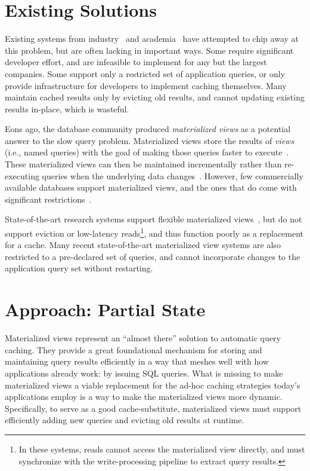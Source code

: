 \section{Existing Solutions}

Existing systems from industry~\cite{facebook-memcache, tao, flannel} and
academia~\cite{txcache, cachegenie, casql-consistency-thesis, pequod} have
attempted to chip away at this problem, but are often lacking in important ways.
Some require significant developer effort, and are infeasible to implement for
any but the largest companies. Some support only a restricted set of application
queries, or only provide infrastructure for developers to implement caching
themselves. Many maintain cached results only by evicting old results, and
cannot updating existing results in-place, which is wasteful.


Eons ago, the database community produced \textit{materialized views} as a
potential answer to the slow query problem. Materialized views store the results
of \textit{views} (i.e., named queries) with the goal of making those queries
faster to execute~\cite{materialized-views}. These materialized views can then
be maintained incrementally rather than re-executing queries when the underlying
data changes~\cite{materialized-survey}. However, few commercially available
databases support materialized views, and the ones that do come with significant
restrictions~\cite{mssql-materialized-view-restrictions}.

State-of-the-art research systems support flexible materialized
views~\cite{dbtoaster,materialize}, but do not support eviction or low-latency
reads\footnote{In these systems, reads cannot access the materialized view
directly, and must synchronize with the write-processing pipeline to extract
query results.}, and thus function poorly as a replacement for a cache. Many
recent state-of-the-art materialized view systems are also restricted to a
pre-declared set of queries, and cannot incorporate changes to the application
query set without restarting.

\section{Approach: Partial State}

Materialized views represent an ``almost there'' solution to automatic query
caching. They provide a great foundational mechanism for storing and maintaining
query results efficiently in a way that meshes well with how applications
already work: by issuing SQL queries. What is missing to make materialized views
a viable replacement for the ad-hoc caching strategies today's applications
employ is a way to make the materialized views more dynamic. Specifically, to
serve as a good cache-substitute, materialized views must support efficiently
adding new queries and evicting old results at runtime.

